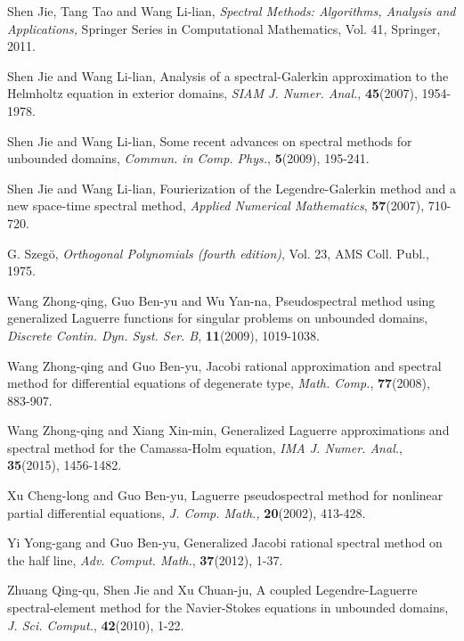 \documentclass[10pt,reqno]{amsart}
\theoremstyle{remark}
\theoremstyle{definition}
\begin{document}
\begin{thebibliography}{99}
 Shen Jie, Tang Tao and Wang Li-lian, {\it Spectral Methods: Algorithms, Analysis and
Applications,} Springer Series in Computational Mathematics, Vol.
41, Springer, 2011.

  Shen Jie and Wang Li-lian, Analysis of a spectral-Galerkin approximation to the Helmholtz equation in exterior domains, {\it SIAM J. Numer. Anal.}, {\bf 45}(2007), 1954-1978.

 Shen Jie and Wang Li-lian,
Some recent advances on spectral methods for unbounded
 domains, {\it Commun. in Comp. Phys.}, {\bf 5}(2009), 195-241.

 Shen Jie and Wang Li-lian,
Fourierization of the Legendre-Galerkin method and a new space-time spectral method,
{\it Applied Numerical Mathematics}, {\bf 57}(2007), 710-720.

G. Szeg\"o, {\it Orthogonal Polynomials (fourth edition)}, Vol. 23,
AMS Coll. Publ., 1975.

 Wang Zhong-qing, Guo Ben-yu and Wu Yan-na, Pseudospectral method
using generalized Laguerre functions for singular problems on
unbounded domains, {\it Discrete Contin. Dyn. Syst. Ser. B}, {\bf
11}(2009), 1019-1038.

 Wang Zhong-qing and Guo Ben-yu, Jacobi rational approximation and spectral method for differential equations of degenerate type, {\it Math. Comp.}, {\bf 77}(2008), 883-907.

 Wang Zhong-qing and Xiang Xin-min, Generalized Laguerre approximations and spectral method for the Camassa-Holm equation, {\it IMA J. Numer. Anal.}, {\bf 35}(2015), 1456-1482.

 Xu Cheng-long and Guo Ben-yu, Laguerre pseudospectral method for nonlinear partial
differential equations, {\it J. Comp. Math.,} {\bf 20}(2002),
413-428.

 Yi Yong-gang and Guo Ben-yu, Generalized Jacobi rational spectral method on the half line, {\it Adv. Comput. Math.}, {\bf 37}(2012), 1-37.

 Zhuang Qing-qu, Shen Jie and Xu Chuan-ju, A coupled Legendre-Laguerre spectral-element method for the Navier-Stokes equations in unbounded domains, {\it J. Sci. Comput.}, {\bf 42}(2010), 1-22.

\end{thebibliography}
\end{document}
